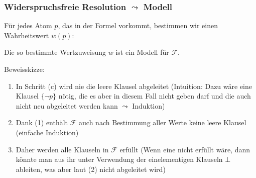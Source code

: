 \documentclass[onlymath]{beamer}
\begin{document}
\begin{frame}\frametitle{Widerspruchsfreie Resolution $\leadsto$ Modell}


Für jedes Atom $p$, das in der Formel vorkommt, bestimmen wir einen Wahrheitswert $w(p)$:\medskip

\smallskip

Die so bestimmte Wertzuweisung $w$ ist ein Modell für $\mathcal{F}$.\bigskip

{\tiny  Beweisskizze:
\begin{enumerate}[(1)]
\item In Schritt (c) wird nie die leere Klausel abgeleitet (Intuition: Dazu wäre eine Klausel $\{\neg p\}$ nötig, die es aber in diesem Fall nicht geben darf und die auch nicht neu abgeleitet werden kann $\leadsto$ Induktion)
\item Dank (1) enthält $\mathcal{F}$ auch nach Bestimmung aller Werte keine leere Klausel (einfache Induktion)
\item Daher werden alle Klauseln in $\mathcal{F}$ erfüllt (Wenn eine nicht erfüllt wäre, dann könnte man aus ihr unter Verwendung der einelementigen Klauseln $\bot$ ableiten, was aber laut (2) nicht abgeleitet wird)
\end{enumerate}}
% 

% 

\end{frame}
\end{document}
